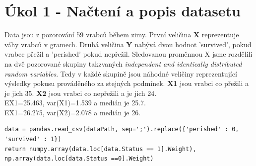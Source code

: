 \documentclass[12pt,a4paper]{article}
\begin{document}
\section{Úkol 1 - Načtení a popis datasetu}
Data jsou z pozorování 59 vrabců během zimy. První veličina {\bf X} reprezentuje váhy vrabců v gramech. Druhá veličina {\bf Y} nabývá dvou hodnot 'survived', pokud vrabec přežil a 'perished' pokud nepřežil. Sledovanou proměnnou X jsme rozdělili na dvě pozorované skupiny takzvaných \textit{independent and identically distributed random variables}. Tedy v každé skupině jsou náhodné veličiny reprezentující výsledky pokusu prováděného za stejných podmínek.  {\bf X1} jsou vrabci co přežili a je jich 35. {\bf X2} jsou vrabci co nepřežili a je jich 24.\\
EX1=25.463, var(X1)=1.539 a medián je 25.7.\\
EX1=26.275, var(X2)=2.078 a medián je 26.\\
\par \medskip
{}
\begin{lstlisting}
data = pandas.read_csv(dataPath, sep=';').replace({'perished' : 0, 'survived' : 1})
return numpy.array(data.loc[data.Status == 1].Weight), np.array(data.loc[data.Status ==0].Weight)
\end{lstlisting}
\end{document}
